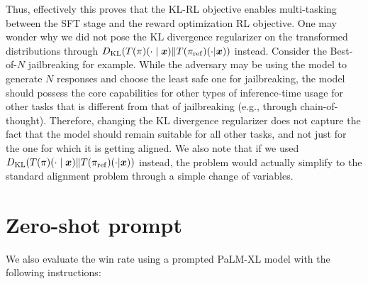 \documentclass{article}
\newcommand{\bx}{{\bm{x}}}
\newcommand{\KL}{D_{\text{KL}}}
\newcommand{\bp}{{\pi_{\rm ref}}} %
\newcommand{\op}{\pi} %
\begin{document}
Thus, effectively this proves that the KL-RL objective enables multi-tasking between the SFT stage and the reward optimization RL objective.
One may wonder why we did not pose the KL divergence regularizer on the transformed distributions through $\KL(T(\op)(\cdot \mid \bx) \| T(\bp)(\cdot | \bx))$ instead. Consider the Best-of-$N$ jailbreaking for example. While the adversary may be using the model to generate $N$ responses and choose the least safe one for jailbreaking, the model should possess the core capabilities for other types of inference-time usage for other tasks that is different from that of jailbreaking  (e.g., through chain-of-thought). Therefore, changing the KL divergence regularizer does not capture the fact that the model should remain suitable for all other tasks, and not just for the one for which it is getting aligned.
We also note that if we used $\KL(T(\op)(\cdot \mid \bx) \| T(\bp)(\cdot | \bx))$ instead, the problem would actually simplify to the standard alignment problem through a simple change of variables.

\clearpage



%
%
%
%
%

%
%
%
%
%
%


\clearpage
\section{Zero-shot prompt}
We also evaluate the win rate using a prompted PaLM-XL model with the following instructions:

\noindent{}
\end{document}

